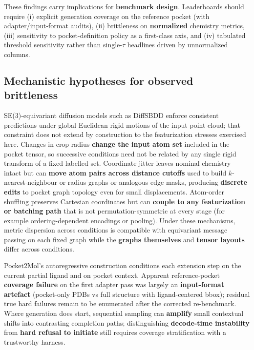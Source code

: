 \documentclass[11pt]{article}
\begin{document}
These findings carry implications for \textbf{benchmark design}. Leaderboards should require (i) explicit generation coverage on the reference pocket (with adapter/input-format audits), (ii) brittleness on \textbf{normalized} chemistry metrics, (iii) sensitivity to pocket-definition policy as a first-class axis, and (iv) tabulated threshold sensitivity rather than single-$\tau$ headlines driven by unnormalized columns.

\subsection{Mechanistic hypotheses for observed brittleness}

SE(3)-equivariant diffusion models such as DiffSBDD enforce consistent predictions under global Euclidean rigid motions of the input point cloud; that constraint does not extend by construction to the featurization stresses exercised here. Changes in crop radius \textbf{change the input atom set} included in the pocket tensor, so successive conditions need not be related by any single rigid transform of a fixed labelled set. Coordinate jitter leaves nominal chemistry intact but can \textbf{move atom pairs across distance cutoffs} used to build $k$-nearest-neighbour or radius graphs or analogous edge masks, producing \textbf{discrete edits} to pocket graph topology even for small displacements. Atom-order shuffling preserves Cartesian coordinates but can \textbf{couple to any featurization or batching path} that is not permutation-symmetric at every stage (for example ordering-dependent encodings or pooling). Under these mechanisms, metric dispersion across conditions is compatible with equivariant message passing on each fixed graph while the \textbf{graphs themselves} and \textbf{tensor layouts} differ across conditions.

Pocket2Mol's autoregressive construction conditions each extension step on the current partial ligand and on pocket context. Apparent reference-pocket \textbf{coverage failure} on the first adapter pass was largely an \textbf{input-format artefact} (pocket-only PDBs vs full structure with ligand-centered bbox); residual true hard failures remain to be enumerated after the corrected re-benchmark. Where generation does start, sequential sampling can \textbf{amplify} small contextual shifts into contrasting completion paths; distinguishing \textbf{decode-time instability} from \textbf{hard refusal to initiate} still requires coverage stratification with a trustworthy harness.
\end{document}
